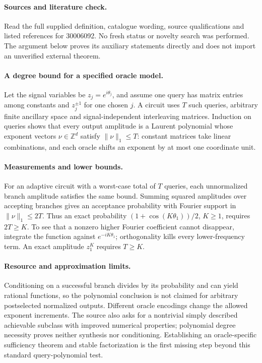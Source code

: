 \documentclass[11pt]{article}
\begin{document}
\paragraph{Sources and literature check.}
Read the full supplied definition, catalogue wording, source qualifications and listed references for 30006092. No fresh status or novelty search was performed. The argument below proves its auxiliary statements directly and does not import an unverified external theorem.

\paragraph{A degree bound for a specified oracle model.} Let the signal variables be \(z_j=e^{i\theta_j}\), and assume one query has matrix entries among constants and \(z_j^{\pm1}\) for one chosen \(j\). A circuit uses \(T\) such queries, arbitrary finite ancillary space and signal-independent interleaving matrices. Induction on queries shows that every output amplitude is a Laurent polynomial whose exponent vectors \(\nu\in\mathbb Z^d\) satisfy \(\|\nu\|_1\leq T\): constant matrices take linear combinations, and each oracle shifts an exponent by at most one coordinate unit.
\paragraph{Measurements and lower bounds.} For an adaptive circuit with a worst-case total of \(T\) queries, each unnormalized branch amplitude satisfies the same bound. Summing squared amplitudes over accepting branches gives an acceptance probability with Fourier support in \(\|\nu\|_1\leq2T\). Thus an exact probability \((1+\cos(K\theta_1))/2\), \(K\geq1\), requires \(2T\geq K\). To see that a nonzero higher Fourier coefficient cannot disappear, integrate the function against \(e^{-iK\theta_1}\); orthogonality kills every lower-frequency term. An exact amplitude \(z_1^K\) requires \(T\geq K\).
\paragraph{Resource and approximation limits.} Conditioning on a successful branch divides by its probability and can yield rational functions, so the polynomial conclusion is not claimed for arbitrary postselected normalized outputs. Different oracle encodings change the allowed exponent increments. The source also asks for a nontrivial simply described achievable subclass with improved numerical properties; polynomial degree necessity proves neither synthesis nor conditioning. Establishing an oracle-specific sufficiency theorem and stable factorization is the first missing step beyond this standard query-polynomial test.
\end{document}
